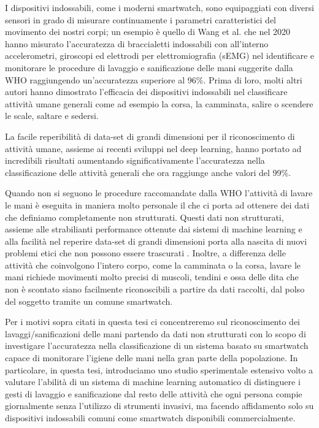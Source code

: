 I dispositivi indossabili, come i moderni smartwatch, sono equipaggiati con diversi sensori in grado di misurare continuamente i parametri caratteristici del movimento dei nostri corpi; un esempio è quello di Wang et al.\cite{wang2020accurate} che nel 2020 hanno misurato l'accuratezza di braccialetti indossabili con all'interno accelerometri, giroscopi ed elettrodi per elettromiografia (sEMG) nel identificare e monitorare le procedure di lavaggio e sanificazione delle mani suggerite dalla WHO raggiungendo un'accuratezza superiore al 96\%.
Prima di loro, molti altri autori hanno dimostrato l'efficacia dei dispositivi indossabili nel classificare attività umane generali come ad esempio la corsa, la camminata, salire o scendere le scale, saltare e sedersi\cite{zhang2013human}\cite{sztyler2016body}\cite{sztyler2017position}\cite{bhat2018online}\cite{koping2018general}\cite{lattanzi2022exploring}.

La facile reperibilità di data-set di grandi dimensioni per il riconoscimento di attività umane, assieme ai recenti sviluppi nel deep learning, hanno portato ad incredibili risultati aumentando significativamente l'accuratezza nella classificazione delle attività generali che ora raggiunge anche valori del 99\%\cite{cheng2010active}\cite{singh2017convolutional}\cite{hassan2018robust}\cite{hou2020study}.

Quando non si seguono le procedure raccomandate dalla WHO l'attività di lavare le mani è eseguita in maniera molto personale il che ci porta ad ottenere dei dati che definiamo completamente non strutturati.
Questi dati non strutturati, assieme alle strabilianti performance ottenute dai sistemi di machine learning e alla facilità nel reperire data-set di grandi dimensioni porta alla nascita di nuovi problemi
etici che non possono essere trascurati \cite{muller2021ten}. Inoltre, a differenza delle attività che coinvolgono l'intero corpo, come la camminata o la corsa, lavare le mani richiede movimenti molto precisi di muscoli, tendini e ossa delle dita che non è scontato siano facilmente riconoscibili a partire da dati raccolti, dal polso del soggetto tramite un comune smartwatch. 

Per i motivi sopra citati in questa tesi ci concentreremo sul riconoscimento dei lavaggi/sanificazioni delle mani partendo da dati non strutturati con lo scopo di investigare l'accuratezza nella 
classificazione di un sistema basato su smartwatch capace di monitorare l'igiene delle mani nella gran parte della popolazione. In particolare, in questa tesi, introduciamo uno studio sperimentale 
estensivo volto a valutare l'abilità di un sistema di machine learning automatico di distinguere i gesti di lavaggio e sanificazione dal resto delle attività che ogni persona compie giornalmente 
senza l'utilizzo di strumenti invasivi, ma facendo affidamento solo su dispositivi indossabili comuni come smartwatch disponibili commercialmente.

